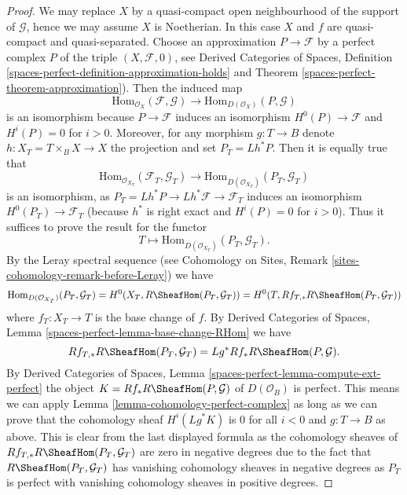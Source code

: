 \begin{proof}
We may replace $X$ by a quasi-compact open neighbourhood of
the support of $\mathcal{G}$, hence we may assume $X$ is Noetherian.
In this case $X$ and $f$ are quasi-compact and quasi-separated.
Choose an approximation $P \to \mathcal{F}$ by a perfect complex $P$ of
the triple $(X, \mathcal{F}, 0)$, see
Derived Categories of Spaces, Definition
\ref{spaces-perfect-definition-approximation-holds} and
Theorem \ref{spaces-perfect-theorem-approximation}).
Then the induced map
$$
\text{Hom}_{\mathcal{O}_X}(\mathcal{F}, \mathcal{G})
\longrightarrow
\text{Hom}_{D(\mathcal{O}_X)}(P, \mathcal{G})
$$
is an isomorphism because $P \to \mathcal{F}$ induces an isomorphism
$H^0(P) \to \mathcal{F}$ and $H^i(P) = 0$ for $i > 0$.
Moreover, for any morphism $g : T \to B$
denote $h : X_T = T \times_B X \to X$ the projection and set
$P_T = Lh^*P$. Then it is equally true that
$$
\text{Hom}_{\mathcal{O}_{X_T}}(\mathcal{F}_T, \mathcal{G}_T)
\longrightarrow
\text{Hom}_{D(\mathcal{O}_{X_T})}(P_T, \mathcal{G}_T)
$$
is an isomorphism, as $P_T = Lh^*P \to Lh^*\mathcal{F} \to \mathcal{F}_T$
induces an isomorphism $H^0(P_T) \to \mathcal{F}_T$ (because $h^*$ is
right exact and $H^i(P) = 0$ for $i > 0$). Thus it suffices to prove the
result for the functor
$$
T \longmapsto \text{Hom}_{D(\mathcal{O}_{X_T})}(P_T, \mathcal{G}_T).
$$
By the Leray spectral sequence (see Cohomology on Sites, Remark
\ref{sites-cohomology-remark-before-Leray}) we have
$$
\text{Hom}_{D(\mathcal{O}_{X_T})}(P_T, \mathcal{G}_T) =
H^0(X_T, R\SheafHom(P_T, \mathcal{G}_T)) =
H^0(T, Rf_{T, *}R\SheafHom(P_T, \mathcal{G}_T))
$$
where $f_T : X_T \to T$ is the base change of $f$. By
Derived Categories of Spaces, Lemma
\ref{spaces-perfect-lemma-base-change-RHom}
we have
$$
Rf_{T, *}R\SheafHom(P_T, \mathcal{G}_T) = Lg^*Rf_*R\SheafHom(P, \mathcal{G}).
$$
By
Derived Categories of Spaces, Lemma
\ref{spaces-perfect-lemma-compute-ext-perfect}
the object $K = Rf_*R\SheafHom(P, \mathcal{G})$ of $D(\mathcal{O}_B)$
is perfect. This means we can apply
Lemma \ref{lemma-cohomology-perfect-complex}
as long as we can prove that the cohomology sheaf
$H^i(Lg^*K)$ is $0$ for all $i < 0$ and $g : T \to B$ as above.
This is clear from the last displayed formula as
the cohomology sheaves of
$Rf_{T, *}R\SheafHom(P_T, \mathcal{G}_T)$
are zero in negative degrees
due to the fact that $R\SheafHom(P_T, \mathcal{G}_T)$ has vanishing
cohomology sheaves in negative degrees as $P_T$ is perfect with
vanishing cohomology sheaves in positive degrees.
\end{proof}

